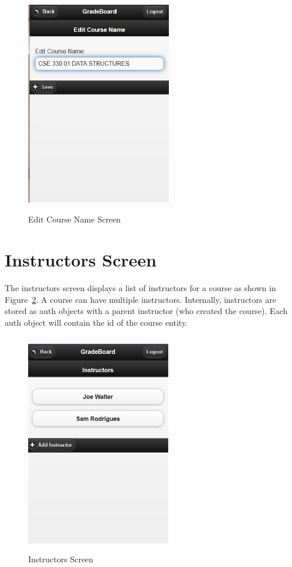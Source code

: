 \vspace{3em}
\begin{figure}[H]
\begin{center}
\includegraphics[height=3.8in,width=2.5in]{images/editcoursename_screen.jpg}
\caption{Edit Course Name Screen}
\label{fig:editcoursename_screen}
\end{center}
\end{figure}

\newpage
\section{Instructors Screen}
The instructors screen displays a list of instructors for a course as shown in Figure~\ref{fig:instructors_screen}. A course can have multiple instructors. Internally, instructors are stored as auth objects with a parent instructor (who created the course). Each auth object will contain the id of the course entity.

\vspace{3em}
\begin{figure}[H]
\begin{center}
\includegraphics[height=3.8in,width=2.5in]{images/instructors_screen.jpg}
\caption{Instructors Screen}
\label{fig:instructors_screen}
\end{center}
\end{figure}

